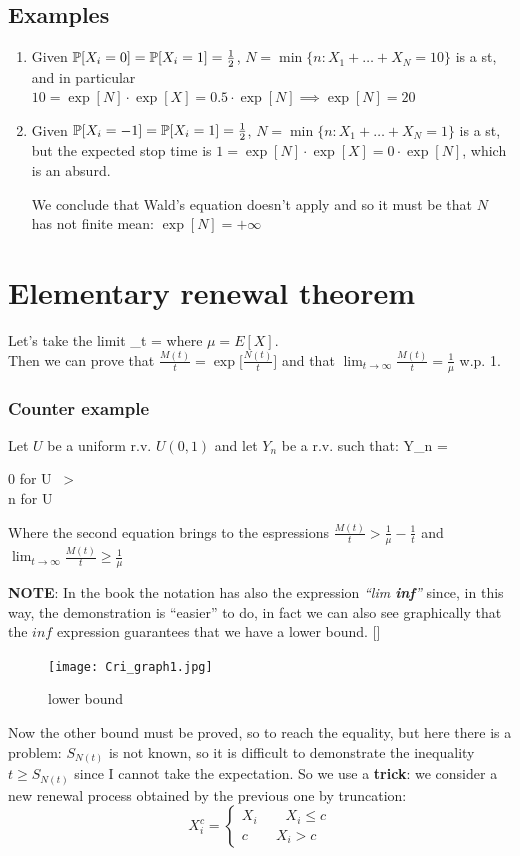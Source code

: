 \subsection{Examples}
	\begin{enumerate}
		\item Given $\mathbb{P}[X_i=0]=\mathbb{P}[X_i = 1] = \frac{1}{2}$, $N = \min\{n : X_1 + \dots + X_N =10\}$ is a \gls{st}, and in particular
		$10 = \exp[N] \cdot \exp[X] = 0.5 \cdot \exp[N] \implies \exp[N]=20$
		\item Given $\mathbb{P}[X_i=-1]=\mathbb{P}[X_i = 1] = \frac{1}{2}$, $N = \min\{n : X_1 + \dots + X_N =1\}$ is a \gls{st}, but the expected stop time
		is $1 = \exp[N] \cdot \exp[X] = 0 \cdot \exp[N] $, which is an absurd.

		We conclude that Wald's equation doesn't apply and so it must be that $N$ has not finite mean: $\exp[N]=+\infty$
	\end{enumerate}

	\section{Elementary renewal theorem}
	Let's take the limit
	\beq
	\lim_{t \to \infty} = 
	\eeq
	where $\mu = E[X]$.\\
	Then we can prove that $\frac{M(t)}{t} = \exp\bigg[\frac{N(t)}{t}\bigg]$ and that $\lim_{t \to \infty}\frac{M(t)}{t} = \frac{1}{\mu}$ w.p. 1.
	\subsubsection{Counter example}
	Let $U$ be a uniform r.v. $U(0,1)$ and let $Y_n$ be a r.v. such that:
	\beq
	Y_n =
	\begin{cases}
	0 \quad for \quad U \ > \\
	n \quad for \quad U \leq {}
	\end{cases}
	\eeq
	Where the second equation brings to the espressions $\frac{M(t)}{t} > \frac{1}{\mu} - \frac{1}{t}$ and $\lim_{t \to \infty} \frac{M(t)}{t} \geq \frac{1}{\mu}$

	\textbf{NOTE}: In the book the notation has also the expression \textit{``lim \textbf{inf}''} since, in this way, the demonstration is ``easier'' to do, in fact we can also see graphically that the $inf$ expression guarantees that we have a lower bound. [\Fig{fig:graph1}]
	\begin{figure}[h]
	\centering
	\texttt{[image: Cri\_graph1.jpg]}
	\caption{lower bound}
	\label{fig:graph1}
	\end{figure}
	Now the other bound must be proved, so to reach the equality, but here there is a problem: $S_{N(t)}$ is not known, so it is difficult to demonstrate the inequality $t \geq S_{N(t)}$ since I cannot take the expectation. So we use a \textbf{trick}: we consider a new renewal process obtained by the previous one by truncation:
	\begin{equation}
	X_i^c =
	\begin{cases}
	X_i \qquad X_i \leq c\\
	c \qquad X_i >c
	\end{cases}
	\end{equation}


